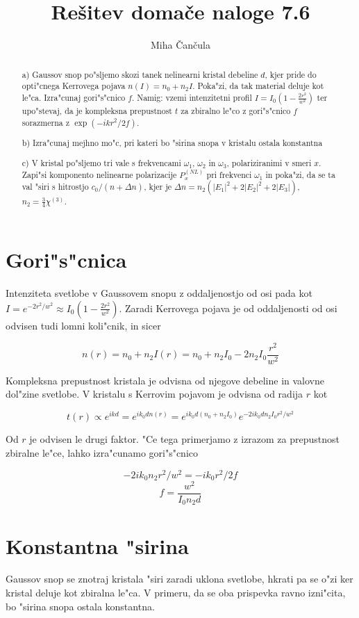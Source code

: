 \documentclass[a4paper,10pt]{article}
\title{Re\v sitev doma\v ce naloge 7.6}
\author{Miha \v Can\v cula}
\begin{document}
\maketitle

\begin{abstract}
a) Gaussov snop po"sljemo skozi tanek nelinearni kristal debeline $d$, kjer pride do opti"cnega Kerrovega pojava $n(I) = n_0 + n_2 I$. Poka"zi, da tak material deluje kot le"ca. Izra"cunaj gori"s"cnico $f$. Namig: vzemi intenzitetni profil $I = I_0(1-\frac{2r^2}{w^2})$ ter upo"stevaj, da je kompleksna prepustnost $t$ za zbiralno le"co z gori"s"cnico $f$ sorazmerna z $\exp(-ikr^2/2f)$. 

b) Izra"cunaj mejhno mo"c, pri kateri bo "sirina snopa v kristalu ostala konstantna

c) V kristal po"sljemo tri vale s frekvencami $\omega_1$, $\omega_2$ in $\omega_3$, polariziranimi v smeri $x$. Zapi"si komponento nelinearne polarizacije $P_{x}^{(NL)}$ pri frekvenci $\omega_1$ in poka"zi, da se ta val "siri s hitrostjo $c_0/(n+\Delta n)$, kjer je $\Delta n = n_2(|E_1|^2 + 2|E_2|^2 + 2|E_3|)$, $n_2 = \frac{3}{4}\chi^{(3)}$. 
\end{abstract}

\section{Gori"s"cnica}

Intenziteta svetlobe v Gaussovem snopu z oddaljenostjo od osi pada kot $I = e^{-2r^2/w^2} \approx I_0(1 - \frac{2r^2}{w^2})$. Zaradi Kerrovega pojava je od oddaljenosti od osi odvisen tudi lomni koli"cnik, in sicer

$$n(r) = n_0 + n_2 I(r) = n_0 + n_2I_0 - 2n_2I_0\frac{r^2}{w^2}$$

Kompleksna prepustnost kristala je odvisna od njegove debeline in valovne dol"zine svetlobe. V kristalu s Kerrovim pojavom je odvisna od radija $r$ kot

$$t(r) \propto e^{ikd} = e^{ik_0d n(r)} = e^{ik_0d(n_0 + n_2I_0)} e^{-2ik_0dn_2I_0 r^2/w^2}$$

Od $r$ je odvisen le drugi faktor. "Ce tega primerjamo z izrazom za prepustnost zbiralne le"ce, lahko izra"cunamo gori"s"cnico

$$-2ik_0n_2 r^2/w^2 = -ik_0r^2/2f$$
$$f = \frac{w^2}{I_0 n_2 d}$$

\section{Konstantna "sirina}

Gaussov snop se znotraj kristala "siri zaradi uklona svetlobe, hkrati pa se o"zi ker kristal deluje kot zbiralna le"ca. V primeru, da se oba prispevka ravno izni"cita, bo "sirina snopa ostala konstantna. 
\end{document}
